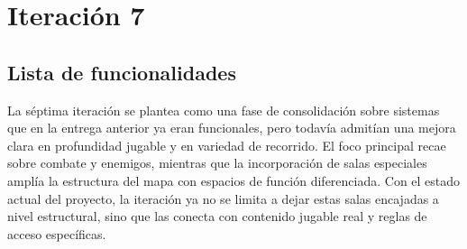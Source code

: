\chapter{Iteración 7}

\begin{abstract}
Esta iteración se orienta a consolidar sistemas ya introducidos y a extender la estructura
del recorrido con salas especiales. El trabajo se centra en refinar el sistema de enemigos y
el sistema de combate, además de cerrar la integración funcional de la sala de tienda, la
sala de tesoro y la sala secreta dentro de la generación procedural del mapa.
\end{abstract}

\section{Lista de funcionalidades}
La séptima iteración se plantea como una fase de consolidación sobre sistemas que en la
entrega anterior ya eran funcionales, pero todavía admitían una mejora clara en profundidad
jugable y en variedad de recorrido. El foco principal recae sobre combate y enemigos,
mientras que la incorporación de salas especiales amplía la estructura del mapa con espacios
de función diferenciada. Con el estado actual del proyecto, la iteración ya no se limita a
dejar estas salas encajadas a nivel estructural, sino que las conecta con contenido jugable
real y reglas de acceso específicas.

